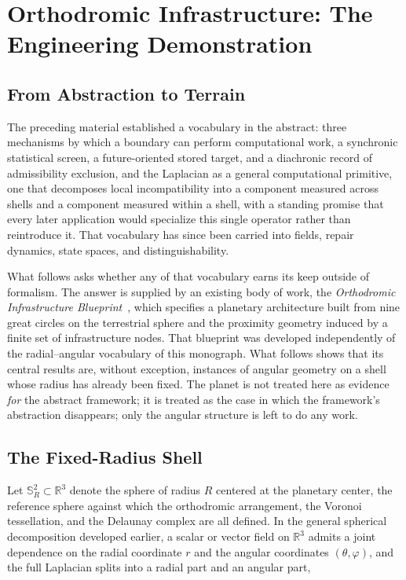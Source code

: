 \documentclass[11pt,fleqn]{book}
\numberwithin{equation}{chapter}
\theoremstyle{plain}
\theoremstyle{definition}
\theoremstyle{remark}
\newcommand{\Sphere}{\mathbb{S}^{2}}
\newcommand{\R}{\mathbb{R}}
\begin{document}
\chapter{Orthodromic Infrastructure: The Engineering Demonstration}

\section{From Abstraction to Terrain}

The preceding material established a vocabulary in the abstract: three mechanisms by which a boundary can perform computational work, a synchronic statistical screen, a future-oriented stored target, and a diachronic record of admissibility exclusion, and the Laplacian as a general computational primitive, one that decomposes local incompatibility into a component measured across shells and a component measured within a shell, with a standing promise that every later application would specialize this single operator rather than reintroduce it. That vocabulary has since been carried into fields, repair dynamics, state spaces, and distinguishability.

What follows asks whether any of that vocabulary earns its keep outside of formalism. The answer is supplied by an existing body of work, the \emph{Orthodromic Infrastructure Blueprint}~\cite{orthodromic}, which specifies a planetary architecture built from nine great circles on the terrestrial sphere and the proximity geometry induced by a finite set of infrastructure nodes. That blueprint was developed independently of the radial--angular vocabulary of this monograph. What follows shows that its central results are, without exception, instances of angular geometry on a shell whose radius has already been fixed. The planet is not treated here as evidence \emph{for} the abstract framework; it is treated as the case in which the framework's abstraction disappears; only the angular structure is left to do any work.

\section{The Fixed-Radius Shell}

Let \(\Sphere_R\subset\R^3\) denote the sphere of radius \(R\) centered at the planetary center, the reference sphere against which the orthodromic arrangement, the Voronoi tessellation, and the Delaunay complex are all defined. In the general spherical decomposition developed earlier, a scalar or vector field on \(\R^3\) admits a joint dependence on the radial coordinate \(r\) and the angular coordinates \((\theta,\varphi)\), and the full Laplacian splits into a radial part and an angular part,
\end{document}
